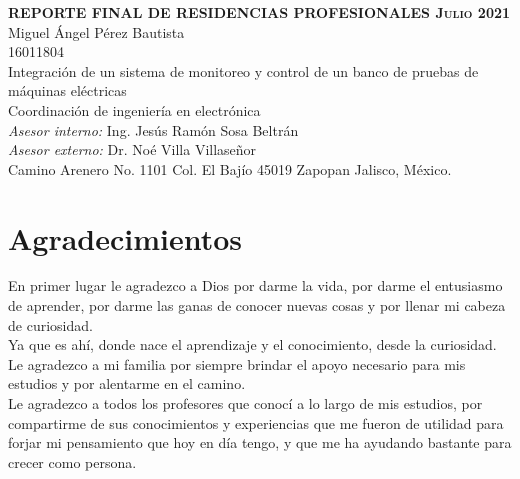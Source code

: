 \documentclass[12pt,titlepage]{article}
\begin{document}
\begin{titlepage}
\begin{center}
 \hspace{17mm}\textbf{\textsc{REPORTE FINAL DE RESIDENCIAS PROFESIONALES \newline
 Julio 2021}}\\[10mm]
  Miguel Ángel Pérez Bautista \\[4.5mm]
  16011804 \\[4.5mm]
 Integración de un sistema de monitoreo y control de un banco de pruebas de máquinas eléctricas\\[4.5mm]
 Coordinación de ingeniería en electrónica\\[4.5mm]
 \vspace{5mm}
\textsl{Asesor interno: }     Ing. Jesús Ramón Sosa Beltrán\\[5mm]
\textsl{Asesor externo: } Dr. Noé Villa Villaseñor\\[5mm]
 \vspace{8mm}
\hspace*{1.0cm} Camino Arenero No. 1101 Col. El Bajío 45019 Zapopan Jalisco, México.
\end{center}
\end{titlepage} %
\newpage %
\section*{Agradecimientos}
En primer lugar le agradezco a Dios por darme la vida, por darme el entusiasmo de aprender, por darme las ganas de conocer nuevas cosas y por llenar mi cabeza de curiosidad. \\

Ya que es ahí, donde nace el aprendizaje y el conocimiento, desde la curiosidad. \\

Le agradezco a mi familia por siempre brindar el apoyo necesario para mis estudios y por alentarme en el camino. \\

Le agradezco a todos los  profesores que conocí a lo largo de mis estudios, por compartirme de sus conocimientos y experiencias que me fueron de utilidad para forjar mi pensamiento que hoy en día tengo, y que me ha ayudando bastante para crecer como persona. \\
\end{document}

